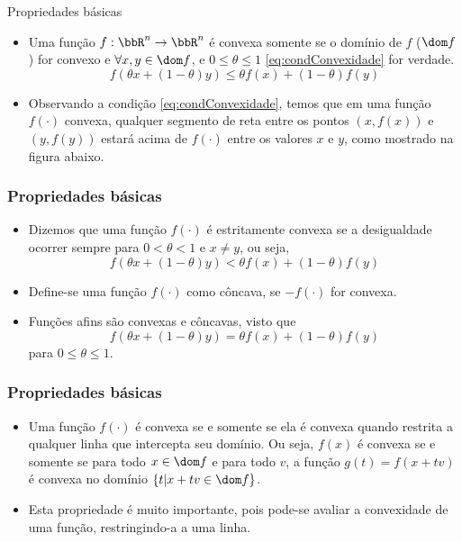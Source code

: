 \begin{frame}{Propriedades básicas}
  \begin{itemize}
    \item Uma função $f: \bbR^n \rightarrow \bbR^n$ é convexa somente se o domínio de $f$ ($\dom f$) for convexo e 
    $\forall x, y \in \dom f$, e $0 \leq \theta \leq 1$ \eqref{eq:condConvexidade} for verdade.
    \begin{equation}
      f(\theta x + (1-\theta) y) \leq \theta f(x) + (1-\theta) f(y)
      \label{eq:condConvexidade}
    \end{equation}
    \item Observando a condição \eqref{eq:condConvexidade}, temos que em uma função $f(\cdot)$ convexa, qualquer 
    segmento de reta entre os pontos $(x, f(x))$ e $(y, f(y))$ estará acima de $f(\cdot)$ entre os valores $x$ e $y$, 
    como mostrado na figura abaixo.
    \begin{figure}
      \centering
    \end{figure}
  \end{itemize}
\end{frame}

\begin{frame}
  \frametitle{Propriedades básicas}
  \begin{itemize}
    \item Dizemos que uma função $f(\cdot)$ é estritamente convexa se a desigualdade ocorrer sempre para $0 < \theta < 
    1$ e $x \neq y$, ou seja,
    \begin{equation}
      f(\theta x + (1-\theta) y) < \theta f(x) + (1-\theta) f(y)
      \label{eq:condConvexidadeEstrita}
    \end{equation}
    \item Define-se uma função $f(\cdot)$ como côncava, se $-f(\cdot)$ for convexa.
    \item Funções afins são convexas e côncavas, visto que
    \begin{equation}
      f(\theta x + (1-\theta) y) = \theta f(x) + (1-\theta) f(y)
      \label{eq:condFuncaoAfim}
    \end{equation}
    para $0 \leq \theta \leq 1$.
  \end{itemize}
\end{frame}

\begin{frame}
  \frametitle{Propriedades básicas}
  \begin{itemize}
    \item Uma função $f(\cdot)$ é convexa se e somente se ela é convexa quando restrita a qualquer linha que intercepta 
    seu domínio. Ou seja, $f(x)$ é convexa se e somente se para todo $x \in \dom f$ e para todo $v$, a função $g(t) = 
    f(x + tv)$ é convexa no domínio $\{t | x + tv \in \dom f\}$.
    \item Esta propriedade é muito importante, pois pode-se avaliar a convexidade de uma função, restringindo-a a uma 
    linha.
  \end{itemize}
\end{frame}

